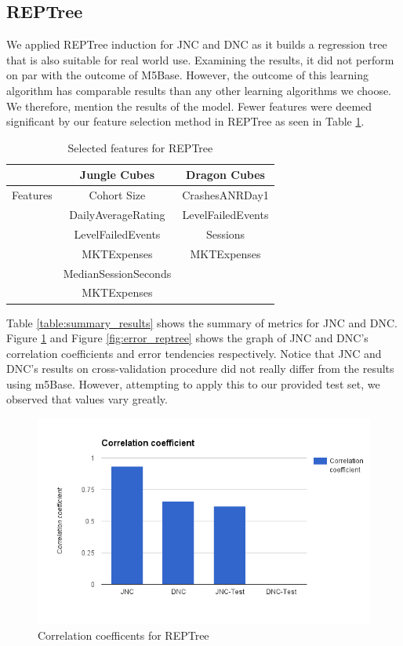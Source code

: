 \subsection{REPTree}
We applied REPTree induction for JNC and DNC as it builds a regression tree that is also suitable for real world use. Examining the results, it did not perform on par with the outcome of M5Base. However, the outcome of this learning algorithm  has comparable results than any other learning algorithms we choose. We therefore, mention the results of the model. Fewer features were deemed significant by our feature selection method in REPTree as seen in Table \ref{table:reptree_features}.

\begin{table}[h]
\centering
\caption{Selected features for REPTree}
\label{table:reptree_features}
\begin{tabular}{|c|c|c|}
\hline 
 & Jungle Cubes & Dragon Cubes\\ 
\hline 
Features & Cohort Size & CrashesANRDay1 
\\& DailyAverageRating & LevelFailedEvents 
\\& LevelFailedEvents & Sessions
\\& MKTExpenses & MKTExpenses
\\& MedianSessionSeconds &  
\\& MKTExpenses &  
\\ 
\hline 
\end{tabular}
\end{table}

Table \ref{table:summary_results} shows the summary of metrics for JNC and DNC. Figure \ref{fig:correl_reptree} and Figure \ref{fig:error_reptree} shows the graph of JNC and DNC's correlation coefficients and error tendencies respectively. Notice that JNC and DNC's results on cross-validation procedure did not really differ from the results using m5Base. However, attempting to apply this to our provided test set, we observed that values vary greatly.

\begin{figure}[h]
\centering
\includegraphics[scale=0.4]{figures/REPTree_1.png} 
\caption{Correlation coefficents for REPTree}
\label{fig:correl_reptree}
\end{figure}

